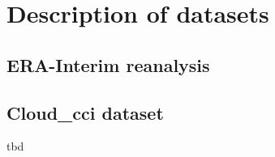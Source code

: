 
\section{Description of datasets}\label{sec:datasets}


\subsection{ERA-Interim reanalysis}\label{sec:era}




\subsection{Cloud\_cci dataset}\label{sec:cloudcci}
tbd